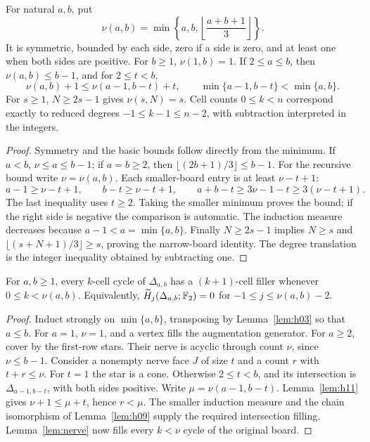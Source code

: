 \begin{lemma}\label{lem:h11}
For natural \(a,b\), put
\[
 \nu(a,b)=\min\left\{a,b,\left\lfloor\frac{a+b+1}{3}\right\rfloor\right\}.
\]
It is symmetric, bounded by each side, zero if a side is zero, and at least
one when both sides are positive. For \(b\ge1\), \(\nu(1,b)=1\).
If \(2\le a\le b\), then \(\nu(a,b)\le b-1\), and for \(2\le t<b\),
\[
 \nu(a,b)+1\le\nu(a-1,b-t)+t,
 \qquad \min\{a-1,b-t\}<\min\{a,b\}.
\]
For \(s\ge1\), \(N\ge2s-1\) gives \(\nu(s,N)=s\).
Cell counts \(0\le k<n\) correspond exactly to reduced degrees
\(-1\le k-1\le n-2\), with subtraction interpreted in the integers.
\end{lemma}
\begin{proof}
Symmetry and the basic bounds follow directly from the minimum.
If \(a<b\), \(\nu\le a\le b-1\); if \(a=b\ge2\), then
\(\lfloor(2b+1)/3\rfloor\le b-1\).
For the recursive bound write \(\nu=\nu(a,b)\). Each smaller-board
entry is at least \(\nu-t+1\):
\[
 a-1\ge\nu-t+1,\qquad b-t\ge\nu-t+1,
 \qquad a+b-t\ge3\nu-1-t\ge3(\nu-t+1).
\]
The last inequality uses \(t\ge2\). Taking the smaller minimum proves
the bound; if the right side is negative the comparison is automatic.
The induction measure decreases because \(a-1<a=\min\{a,b\}\).
Finally \(N\ge2s-1\) implies \(N\ge s\) and
\(\lfloor(s+N+1)/3\rfloor\ge s\), proving the narrow-board identity.
The degree translation is the integer inequality obtained by subtracting one.
\end{proof}

\begin{theorem}
\label{thm:chessboard}
For \(a,b\ge1\), every \(k\)-cell cycle of \(\Delta_{a,b}\) has a
\((k+1)\)-cell filler whenever \(0\le k<\nu(a,b)\). Equivalently,
\(\widetilde H_j(\Delta_{a,b};\mathbb F_2)=0\) for
\(-1\le j\le\nu(a,b)-2\).
\end{theorem}
\begin{proof}
Induct strongly on \(\min\{a,b\}\), transposing by Lemma~\ref{lem:h03}
so that \(a\le b\). For \(a=1\), \(\nu=1\), and a vertex fills the
augmentation generator. For \(a\ge2\), cover by the first-row stars.
Their nerve is acyclic through count \(\nu\), since \(\nu\le b-1\).
Consider a nonempty nerve face \(J\) of size \(t\) and a count \(r\)
with \(t+r\le\nu\). For \(t=1\) the star is a cone. Otherwise
\(2\le t<b\), and its intersection is \(\Delta_{a-1,b-t}\), with both
sides positive. Write \(\mu=\nu(a-1,b-t)\).
Lemma~\ref{lem:h11} gives \(\nu+1\le\mu+t\), hence \(r<\mu\).
The smaller induction measure and the chain isomorphism of
Lemma~\ref{lem:h09} supply the required intersection filling.
Lemma~\ref{lem:nerve} now fills every \(k<\nu\) cycle of the original board.
\end{proof}

